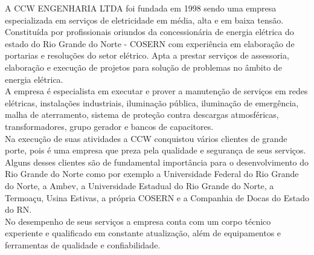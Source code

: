
	A CCW ENGENHARIA LTDA foi fundada em 1998 sendo uma empresa
	especializada em serviços de eletricidade em média, alta e em baixa tensão.
	\\
	
	Constituída por profissionais oriundos da concessionária de energia elétrica do 
	estado do Rio Grande do Norte - COSERN com experiência em elaboração de portarias e resoluções do setor elétrico. Apta a 
	prestar 
	serviços de assessoria, elaboração e execução de projetos para solução de problemas 
	no	âmbito de energia elétrica.
	\\
	
	A empresa é especialista em executar e prover a manutenção de serviços 
	em	redes elétricas, instalações industriais, iluminação pública, iluminação de 
	emergência, malha de aterramento, sistema de proteção contra descargas 
	atmosféricas, 
	transformadores, grupo gerador e bancos de capacitores.
	\\
	
	Na execução de suas atividades a CCW 
	conquistou vários clientes de grande porte, pois é uma empresa que preza pela qualidade e segurança de seus serviços. Alguns desses clientes são de 
	fundamental importância para o desenvolvimento do Rio Grande do Norte como por 
	exemplo a Universidade 
	Federal do Rio Grande do Norte, a Ambev, a Universidade Estadual do Rio Grande do Norte, a Termoaçu, Usina Estivas, a própria COSERN e a Companhia de Docas do Estado do RN. 
	\\
	
	No desempenho de seus serviços a empresa conta com um 
	corpo técnico experiente e qualificado em constante atualização, além de equipamentos e ferramentas 
	de qualidade e confiabilidade.
